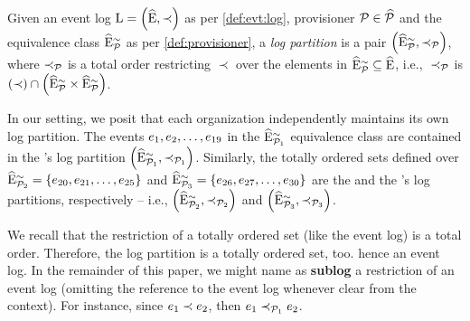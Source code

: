 \begin{newj}
\begin{definition}\label{def:partition}
	Given an event log $\mathrm{L} = \left( \widehat{\mathrm{E}}, \prec \right)$ as per \cref{def:evt:log}, provisioner $\mathcal{P} \in \widehat{\mathcal{P}}$ and the equivalence class $\widehat{\mathrm{E}}^{\sim}_{\mathcal{P}}$ as per \cref{def:provisioner}, a \emph{log partition} is a pair $\left( \widehat{\mathrm{E}}^{\sim}_{\mathcal{P}}, \prec_{\mathcal{P}} \right)$, where $\prec_{\mathcal{P}}$ is a total order restricting $\prec$ over the elements in $\widehat{\mathrm{E}}^{\sim}_{\mathcal{P}} \subseteq \widehat{\mathrm{E}}$, i.e., $\;\prec_{\mathcal{P}}$ is $(\prec) \cap \left(\widehat{\mathrm{E}}^{\sim}_{\mathcal{P}} \times \widehat{\mathrm{E}}^{\sim}_{\mathcal{P}}\right)$.
\end{definition}
%
In our setting, we posit that each organization independently maintains its own log partition. The events  $e_{1}, e_{2}, \ldots, e_{19}$ in the  $\widehat{\mathrm{E}}^{\sim}_{\mathcal{P}_{1}}$ equivalence class are contained in the 's log partition  $\left( \widehat{\mathrm{E}}^{\sim}_{\mathcal{P}_{1}}, \prec_{\mathcal{P}_{1}} \right)$. Similarly, the totally ordered sets defined over $\widehat{\mathrm{E}}^{\sim}_{\mathcal{P}_{2}} = \left\{e_{20}, e_{21}, \ldots, e_{25} \right\}$ and $\widehat{\mathrm{E}}^{\sim}_{\mathcal{P}_{3}} = \left\{ e_{26}, e_{27}, \ldots, e_{30} \right\}$ are the  and the 's log partitions, respectively -- i.e., $\left( \widehat{\mathrm{E}}^{\sim}_{\mathcal{P}_{2}}, \prec_{\mathcal{P}_{2}} \right)$ and  $\left( \widehat{\mathrm{E}}^{\sim}_{\mathcal{P}_{3}}, \prec_{\mathcal{P}_{3}} \right)$. 

We recall that the restriction of a totally ordered set (like the event log) is a total order. Therefore, the log partition is a totally ordered set, too. hence an event log. In the remainder of this paper, we might name as \textbf{sublog} a restriction of an event log (omitting the reference to the event log whenever clear from the context). For instance, since $e_1 \prec e_2$, then $e_1 \prec_{\mathcal{P}_{1}} e_2$. %


\end{newj}
